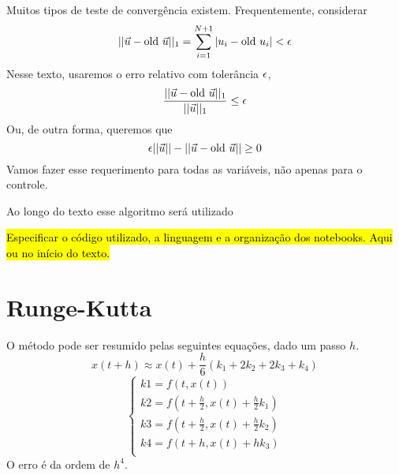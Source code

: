 Muitos tipos de teste de convergência existem. Frequentemente, considerar 
$$
||\vec{u} - \text{old }\vec{u}||_1 = \sum_{i=1}^{N+1} |u_i - \text{old }u_i| < \epsilon   
$$
Nesse texto, usaremos o erro relativo com tolerância $\epsilon$,
$$
\frac{||\vec{u} - \text{old }\vec{u}||_1}{||\vec{u}||_1} \le \epsilon 
$$
Ou, de outra forma, queremos que 
$$
\epsilon ||\vec{u}|| - ||\vec{u} - \text{old }\vec{u}|| \ge 0
$$
Vamos fazer esse requerimento para todas as variáveis, não apenas para o
controle. 

Ao longo do texto esse algoritmo será utilizado 

\hl{Especificar o c\'odigo utilizado, a linguagem e a organiza\c{c}\~ao dos
notebooks. Aqui ou no in\'icio do texto.}

\section{Runge-Kutta}

O método pode ser resumido pelas seguintes equações, dado um passo $h$. 
\begin{equation*}
    x(t + h) \approx x(t) + \frac{h}{6}(k_1 + 2k_2 + 2k_3 + k_4) 
\end{equation*}
\begin{equation*}
    \begin{cases}
    k1 = f(t,x(t)) \\
    k2 = f(t + \frac{h}{2},x(t) + \frac{h}{2}k_1) \\
    k3 = f(t + \frac{h}{2},x(t) + \frac{h}{2}k_2) \\
    k4 = f(t + h, x(t) + hk_3) \\
    \end{cases}
\end{equation*}
O erro é da ordem de $h^4$. 